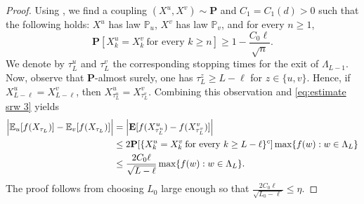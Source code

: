 \documentclass[11pt,a4paper]{article}
\numberwithin{equation}{section}
\theoremstyle{plain}
\theoremstyle{definition}
\begin{document}
\begin{proof}

Using \cite[Lemma~2.4.3]{LawlerLimicRandomWalks2010}, we find a coupling $(X^u,X^v)\sim\mathbf P$ and $C_1=C_1(d)>0$ such that the following holds: $X^u$ has law $\mathbb P_u$, $X^v$ has law $\mathbb P_v$, and for every $n\geq 1$,
\begin{equation}\label{eq:estimate srw 3}
	\mathbf P[X^u_k=X^v_k \: \text{for every }k\geq n]\geq 1-\frac{C_0\ell}{\sqrt{n}}.
\end{equation}
We denote by $\tau^u_L$ and $\tau^v_L$ the corresponding stopping times for the exit of $\Lambda_{L-1}$.
Now, observe that $\mathbf P$-almost surely, one has $\tau_L^{z}\geq L-\ell$ for $z\in \{u,v\}$. Hence, if $X^u_{L-\ell}=X^v_{L-\ell}$, then $X^u_{\tau_L^u}=X^v_{\tau_L^v}$. Combining this observation and \eqref{eq:estimate srw 3} yields
\begin{align}\notag
	\Big|\mathbb E_u[f(X_{\tau_L})]-\mathbb E_v[f(X_{\tau_L})]\Big|&=\Big|\mathbf E[f(X^u_{\tau_L^u})-f(X^v_{\tau_L^v})]\Big|
	\\&\leq 2\mathbf P[\{X_{k}^u=X^v_{k}\: \text{for every }k\geq L-\ell\}^c]\max\{f(w):w\in \Lambda_L\}\notag
	\\&\leq \frac{2C_0\ell}{\sqrt{L-\ell}}\max\{f(w):w\in \Lambda_L\}.
\end{align}
The proof follows from choosing $L_0$ large enough so that $\frac{2C_0\ell}{\sqrt{L_0-\ell}}\leq \eta$.
\end{proof}
\end{document}
